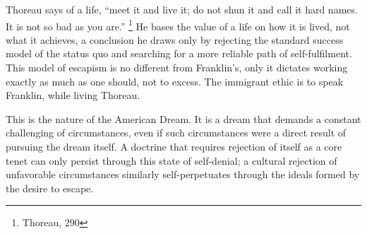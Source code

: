 Thoreau says of a life, ``meet it and live it; do not shun it and call it
hard names. It is not so bad as you are.'' \footnote{Thoreau, 290} He bases the value
of a life on how it is lived, not what it achieves, a conclusion he draws only by
rejecting the standard success model of the status quo and searching for a
more reliable path of self-fulfilment. This model of escapism is no different from
Franklin's, only it dictates working exactly as much as one should, not to excess.
The immigrant ethic is to speak Franklin, while living Thoreau.

This is the nature of the
American Dream. It is a dream that demands a constant challenging of
circumstances, even if such circumstances were a direct result of
pursuing the dream itself. A doctrine that requires rejection of itself as a
core tenet can only persist through this state of self-denial; a cultural rejection of
unfavorable circumstances similarly self-perpetuates through the ideals formed by
the desire to escape.

